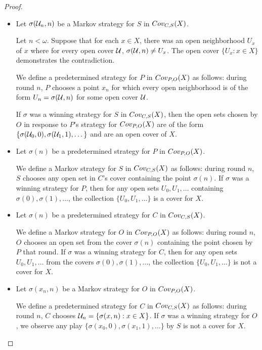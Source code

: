   \begin{proof}

    \begin{itemize}
      \item
      Let $\sigma(\mathcal{U}_n,n)$ be a Markov strategy for $S$ in $Cov_{C,S}(X)$. 

      Let $n<\omega$. Suppose that for each $x\in X$, there was an open neighborhood $U_x$ of $x$ where for every open cover $\mathcal{U}$, $\sigma(\mathcal{U},n)\not=U_x$. The open cover $\{U_x : x\in X\}$ demonstrates the contradiction.

      We define a predetermined strategy for $P$ in $Cov_{P,O}(X)$ as follows: during round $n$, $P$ chooses a point $x_n$ for which every open neighborhood is of the form $U_n = \sigma(\mathcal{U},n)$ for some open cover $\mathcal{U}$.

      If $\sigma$ was a winning strategy for $S$ in $Cov_{C,S}(X)$, then the open sets chosen by $O$ in response to $P$'s strategy for $Cov_{P,O}(X)$ are of the form $\{\sigma(\mathcal{U}_0,0),\sigma(\mathcal{U}_1,1),\dots\}$ and are an open cover of $X$.

      \item
      Let $\sigma(n)$ be a predetermined strategy for $P$ in $Cov_{P,O}(X)$.

      We define a Markov strategy for $S$ in $Cov_{C,S}(X)$ as follows: during round $n$, $S$ chooses any open set in $C$'s cover containing the point $\sigma(n)$. If $\sigma$ was a winning strategy for $P$, then for any open sets $U_0,U_1,\dots$ containing $\sigma(0),\sigma(1),\dots$, the collection $\{U_0,U_1,\dots\}$ is a cover for $X$.

      \item
      Let $\sigma(n)$ be a predetermined strategy for $C$ in $Cov_{C,S}(X)$.

      We define a Markov strategy for $O$ in $Cov_{P,O}(X)$ as follows: during round $n$, $O$ chooses an open set from the cover $\sigma(n)$ containing the point chosen by $P$ that round. If $\sigma$ was a winning strategy for $C$, then for any open sets $U_0,U_1,\dots$ from the covers $\sigma(0),\sigma(1),\dots$, the collection $\{U_0,U_1,\dots\}$ is not a cover for $X$.

      \item
      Let $\sigma(x_n,n)$ be a Markov strategy for $O$ in $Cov_{P,O}(X)$.

      We define a predetermined strategy for $C$ in $Cov_{C,S}(X)$ as follows: during round $n$, $C$ chooses $\mathcal{U}_n = \{\sigma(x,n) : x\in X\}$. If $\sigma$ was a winning strategy for $O$, we observe any play $\{\sigma(x_0,0),\sigma(x_1,1),\dots\}$ by $S$ is not a cover for $X$.

    \end{itemize}

  \end{proof}

